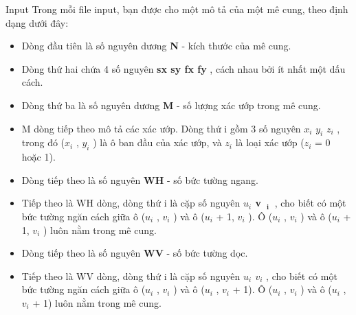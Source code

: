 Input
Trong mỗi file input, bạn được cho một mô tả của một mê cung, theo định dạng dưới đây:
\begin{itemize}
	\item Dòng đầu tiên là số nguyên dương \textbf{ N } - kích thước của mê cung.
	\item Dòng thứ hai chứa 4 số nguyên \textbf{ sx sy fx fy } , cách nhau bởi ít nhất một dấu cách.
	\item Dòng thứ ba là số nguyên dương \textbf{ M } - số lượng xác ướp trong mê cung.
	\item M dòng tiếp theo mô tả các xác ướp. Dòng thứ i gồm 3 số nguyên \textbf{ $x_{i}$}\textbf{ $y_{i}$}\textbf{ $z_{i}$} , trong đó ($x_{i}$ , $y_{i}$ ) là ô ban đầu của xác ướp, và $z_{i}$ là loại xác ướp ($z_{i}$ = 0 hoặc 1).
	\item Dòng tiếp theo là số nguyên \textbf{ WH } - số bức tường ngang.
	\item Tiếp theo là WH dòng, dòng thứ i là cặp số nguyên \textbf{ $u_{i}$ v }$_\textbf{ i }$ , cho biết có một bức tường ngăn cách giữa ô ($u_{i}$ , $v_{i}$ ) và ô ($u_{i}$ + 1, $v_{i}$ ). Ô ($u_{i}$ , $v_{i}$ ) và ô ($u_{i}$ + 1, $v_{i}$ ) luôn nằm trong mê cung.
	\item Dòng tiếp theo là số nguyên \textbf{ WV } - số bức tường dọc.
	\item Tiếp theo là WV dòng, dòng thứ i là cặp số nguyên \textbf{ $u_{i}$ $v_{i}$} , cho biết có một bức tường ngăn cách giữa ô ($u_{i}$ , $v_{i}$ ) và ô ($u_{i}$ , $v_{i}$ + 1). Ô ($u_{i}$ , $v_{i}$ ) và ô ($u_{i}$ , $v_{i}$ + 1) luôn nằm trong mê cung.
\end{itemize}